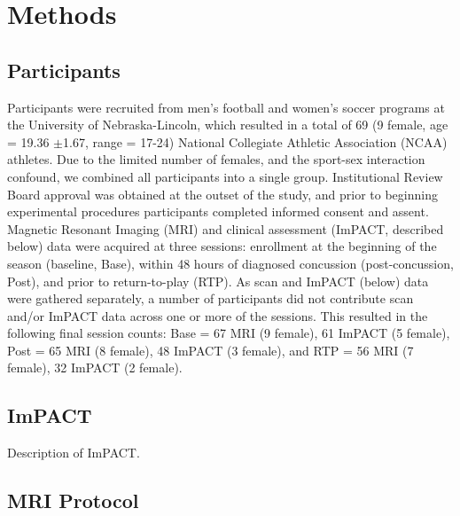 \documentclass[12pt]{article}
\begin{document}


\section{Methods}
\label{sec:meth}

\subsection{Participants}
\label{ssec:meth-part}
Participants were recruited from men's football and women's soccer programs at the University of Nebraska-Lincoln, which resulted in a total of 69 (9 female, age = 19.36 $\pm$1.67, range = 17-24) National Collegiate Athletic Association (NCAA) athletes. Due to the limited number of females, and the sport-sex interaction confound, we combined all participants into a single group. Institutional Review Board approval was obtained at the outset of the study, and prior to beginning experimental procedures participants completed informed consent and assent. Magnetic Resonant Imaging (MRI) and clinical assessment (ImPACT, described below) data were acquired at three sessions: enrollment at the beginning of the season (baseline, Base), within 48 hours of diagnosed concussion (post-concussion, Post), and prior to return-to-play (RTP). As scan and ImPACT (below) data were gathered separately, a number of participants did not contribute scan and/or ImPACT data across one or more of the sessions. This resulted in the following final session counts: Base = 67 MRI (9 female), 61 ImPACT (5 female), Post = 65 MRI (8 female), 48 ImPACT (3 female), and RTP = 56 MRI (7 female), 32 ImPACT (2 female).


\subsection{ImPACT}
\label{ssec:meth-imp}
Description of ImPACT.



\subsection{MRI Protocol}
\label{ssec:meth-mri}
\end{document}
